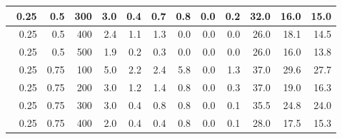 \begin{longtable}{|r|r|r|r|r|r|r|r|r|r|r|r|}
        \hline \
        0.25                           & 0.5                     & 300                       & 3.0                       & 0.4                       & 0.7                       & 0.8                       & 0.0                       & 0.2                       & 32.0                      & 16.0                      & 15.0                      \\
        \hline \
        0.25                           & 0.5                    & 400                       & 2.4                       & 1.1                       & 1.3                       & 0.0                       & 0.0                       & 0.0                       & 26.0                      & 18.1                      & 14.5                      \\
        \hline \
        0.25                           & 0.5                    & 500                       & 1.9                       & 0.2                       & 0.3                       & 0.0                       & 0.0                       & 0.0                       & 26.0                      & 16.0                      & 13.8                      \\
        \hline \
        0.25                           & 0.75                    & 100                       & 5.0                       & 2.2                       & 2.4                       & 5.8                       & 0.0                       & 1.3                       & 37.0                      & 29.6                      & 27.7                      \\
        \hline \
        0.25                           & 0.75                    & 200                       & 3.0                       & 1.2                       & 1.4                       & 0.8                       & 0.0                       & 0.3                       & 37.0                      & 19.0                      & 16.3                      \\
        \hline \
        0.25                           & 0.75                    & 300                       & 3.0                       & 0.4                       & 0.8                       & 0.8                       & 0.0                       & 0.1                       & 35.5                      & 24.8                       & 24.0                       \\
        \hline \
        0.25                           & 0.75                     & 400                       & 2.0                       & 0.4                       & 0.4                       & 0.8                       & 0.0                       & 0.1                       & 28.0                      & 17.5                      & 15.3                      \\

\end{longtable}
